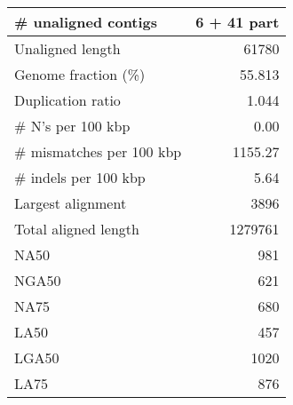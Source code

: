 \documentclass[12pt,a4paper]{article}
\begin{document}
\begin{table}[ht]
\begin{center}
\begin{tabular}{|l*{1}{|r}|}
\# unaligned contigs & 6 + 41 part \\ \hline
Unaligned length & 61780 \\ \hline
Genome fraction (\%) & 55.813 \\ \hline
Duplication ratio & 1.044 \\ \hline
\# N's per 100 kbp & 0.00 \\ \hline
\# mismatches per 100 kbp & 1155.27 \\ \hline
\# indels per 100 kbp & 5.64 \\ \hline
Largest alignment & 3896 \\ \hline
Total aligned length & 1279761 \\ \hline
NA50 & 981 \\ \hline
NGA50 & 621 \\ \hline
NA75 & 680 \\ \hline
LA50 & 457 \\ \hline
LGA50 & 1020 \\ \hline
LA75 & 876 \\ \hline
\end{tabular}
\end{center}
\end{table}
\end{document}
